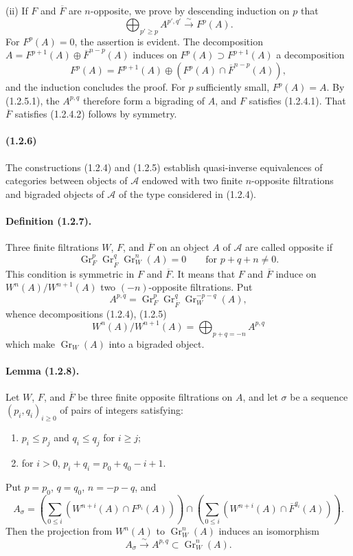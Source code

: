 \documentclass[10pt]{article}
\newcommand{\Gr}{\operatorname{Gr}}
\newcommand{\calA}{\mathcal A}
\newcommand{\iso}{\xrightarrow{\sim}}
\begin{document}
(ii) If $F$ and $\overline F$ are $n$-opposite, we prove by descending induction on $p$ that
\[
\tag{1.2.5.1}
\bigoplus_{p'\ge p} A^{p',q'}\iso F^p(A).
\]
For $F^p(A)=0$, the assertion is evident. The decomposition $A=F^{p+1}(A)\oplus\overline F^{n-p}(A)$ induces on $F^p(A)\supset F^{p+1}(A)$ a decomposition
\[
F^p(A)=F^{p+1}(A)\oplus(F^p(A)\cap\overline F^{n-p}(A)),
\]
and the induction concludes the proof. For $p$ sufficiently small, $F^p(A)=A$. By (1.2.5.1), the $A^{p,q}$ therefore form a bigrading of $A$, and $F$ satisfies (1.2.4.1). That $\overline F$ satisfies (1.2.4.2) follows by symmetry.

\paragraph{(1.2.6)} The constructions (1.2.4) and (1.2.5) establish quasi-inverse equivalences of categories between objects of $\calA$ endowed with two finite $n$-opposite filtrations and bigraded objects of $\calA$ of the type considered in (1.2.4).

\paragraph{Definition (1.2.7).} Three finite filtrations $W$, $F$, and $\overline F$ on an object $A$ of $\calA$ are called opposite if
\[
\Gr_F^p\Gr_{\overline F}^{q}\Gr_W^n(A)=0\qquad\text{for }p+q+n\ne0.
\]
This condition is symmetric in $F$ and $\overline F$. It means that $F$ and $\overline F$ induce on $W^n(A)/W^{n+1}(A)$ two $(-n)$-opposite filtrations. Put
\[
A^{p,q}=\Gr_F^p\Gr_{\overline F}^{q}\Gr_W^{-p-q}(A),
\]
whence decompositions (1.2.4), (1.2.5)
\[
\tag{1.2.7.1}
W^n(A)/W^{n+1}(A)=\bigoplus_{p+q=-n}A^{p,q}
\]
which make $\Gr_W(A)$ into a bigraded object.

\paragraph{Lemma (1.2.8).} Let $W$, $F$, and $\overline F$ be three finite opposite filtrations on $A$, and let $\sigma$ be a sequence $(p_i,q_i)_{i\ge0}$ of pairs of integers satisfying:
\begin{enumerate}[label=\alph*)]
\item $p_i\le p_j$ and $q_i\le q_j$ for $i\ge j$;
\item for $i>0$, $p_i+q_i=p_0+q_0-i+1$.
\end{enumerate}
Put $p=p_0$, $q=q_0$, $n=-p-q$, and
\[
A_\sigma=\left(\sum_{0\le i} (W^{n+i}(A)\cap F^{p_i}(A))\right)
\cap
\left(\sum_{0\le i} (W^{n+i}(A)\cap \overline F^{q_i}(A))\right).
\]
Then the projection from $W^n(A)$ to $\Gr_W^n(A)$ induces an isomorphism
\[
A_\sigma\iso A^{p,q}\subset\Gr_W^n(A).
\]
\end{document}
